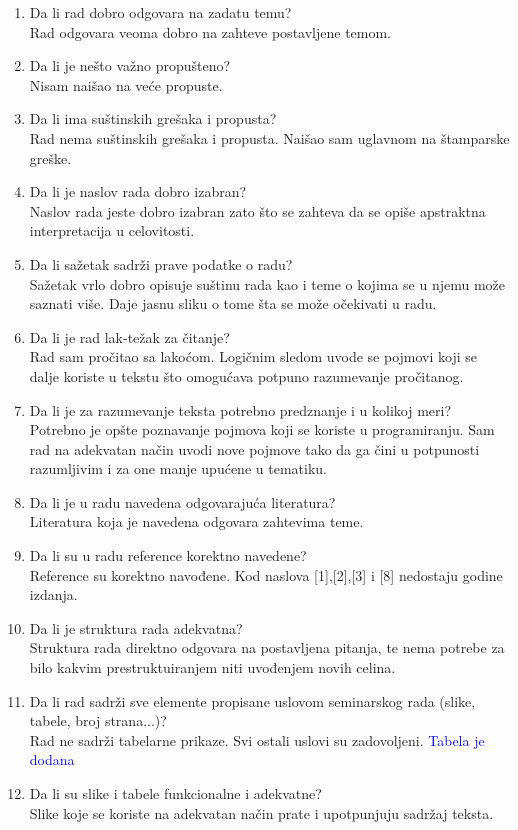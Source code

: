 \documentclass[a4paper]{report}
\newcommand{\odgovor}[1]{\textcolor{blue}{#1}}
\begin{document}
\begin{enumerate}
\item Da li rad dobro odgovara na zadatu temu?\\
Rad odgovara veoma dobro na zahteve postavljene temom.
\item Da li je nešto važno propušteno?\\
Nisam naišao na veće propuste.
\item Da li ima suštinskih grešaka i propusta?\\
Rad nema suštinskih grešaka i propusta. Naišao sam uglavnom na štamparske greške.
\item Da li je naslov rada dobro izabran?\\
Naslov rada jeste dobro izabran zato što se zahteva da se opiše apstraktna interpretacija u celovitosti.
\item Da li sažetak sadrži prave podatke o radu?\\
Sažetak vrlo dobro opisuje suštinu rada kao i teme o kojima se u njemu može saznati više. Daje jasnu sliku o tome šta se može očekivati u radu.
\item Da li je rad lak-težak za čitanje?\\
Rad sam pročitao sa lakoćom. Logičnim sledom uvode se pojmovi koji se dalje koriste u tekstu što omogućava potpuno razumevanje pročitanog.
\item Da li je za razumevanje teksta potrebno predznanje i u kolikoj meri?\\
Potrebno je opšte poznavanje pojmova koji se koriste u programiranju. Sam rad na adekvatan način uvodi nove pojmove tako da ga čini u potpunosti razumljivim i za one manje upućene u tematiku.
\item Da li je u radu navedena odgovarajuća literatura?\\
Literatura koja je navedena odgovara zahtevima teme.
\item Da li su u radu reference korektno navedene?\\
Reference su korektno navođene. Kod naslova [1],[2],[3] i [8] nedostaju godine izdanja.
\item Da li je struktura rada adekvatna?\\
Struktura rada direktno odgovara na postavljena pitanja, te nema potrebe za bilo kakvim prestruktuiranjem niti uvođenjem novih celina.
\item Da li rad sadrži sve elemente propisane uslovom seminarskog rada (slike, tabele, broj strana...)?\\
Rad ne sadrži tabelarne prikaze. Svi ostali uslovi su zadovoljeni.
\odgovor{Tabela je dodana}
\item Da li su slike i tabele funkcionalne i adekvatne?\\
Slike koje se koriste na adekvatan način prate i upotpunjuju sadržaj teksta.
\end{enumerate}
\end{document}
